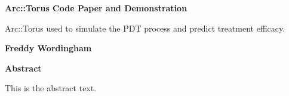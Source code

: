 \documentclass{article}
\begin{document}
\begin{center}
    \Large
    \textbf{Arc::Torus Code Paper and Demonstration}

    \vspace{0.4cm}
    \large
    Arc::Torus used to simulate the PDT process and predict treatment efficacy.

    \vspace{0.4cm}
    \textbf{Freddy Wordingham}

    \vspace{0.9cm}
    \textbf{Abstract}
\end{center}

This is the abstract text.

\newpage
\tableofcontents

\newpage
\printunsrtglossary[type=symbols,style=long]
\end{document}
